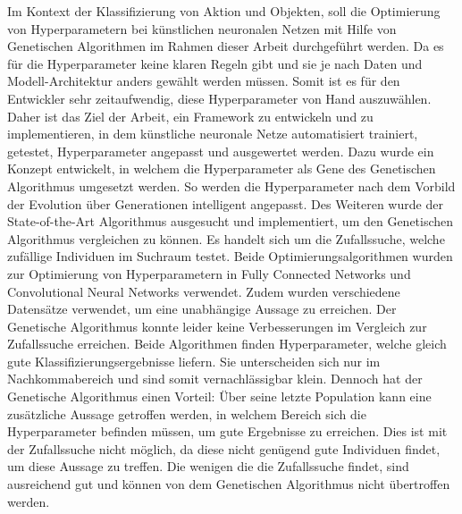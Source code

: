 \label{sec:Kurzfasssung}
Im Kontext der Klassifizierung von Aktion und Objekten, soll die Optimierung von Hyperparametern bei künstlichen neuronalen Netzen mit Hilfe von Genetischen Algorithmen im Rahmen dieser Arbeit durchgeführt werden. Da es für die Hyperparameter keine klaren Regeln gibt und sie je nach Daten und Modell-Architektur anders gewählt werden müssen. Somit ist es für den Entwickler sehr zeitaufwendig, diese Hyperparameter von Hand auszuwählen. Daher ist das Ziel der Arbeit, ein Framework zu entwickeln und zu implementieren, in dem künstliche neuronale Netze automatisiert trainiert, getestet, Hyperparameter angepasst und ausgewertet werden. Dazu wurde ein Konzept entwickelt, in welchem die Hyperparameter als Gene des Genetischen Algorithmus umgesetzt werden. So werden die Hyperparameter nach dem Vorbild der Evolution über Generationen intelligent angepasst. Des Weiteren wurde der State-of-the-Art Algorithmus ausgesucht und implementiert, um den Genetischen Algorithmus vergleichen zu können. Es handelt sich um die Zufallssuche, welche zufällige Individuen im Suchraum testet. Beide Optimierungsalgorithmen wurden zur Optimierung von Hyperparametern in Fully Connected Networks und Convolutional Neural Networks verwendet. Zudem wurden verschiedene Datensätze verwendet, um eine unabhängige Aussage zu erreichen. Der Genetische Algorithmus konnte leider keine Verbesserungen im Vergleich zur Zufallssuche erreichen. Beide Algorithmen finden Hyperparameter, welche gleich gute Klassifizierungsergebnisse liefern. Sie unterscheiden sich nur im Nachkommabereich und sind somit vernachlässigbar klein. Dennoch hat der Genetische Algorithmus einen Vorteil: Über seine letzte Population kann eine zusätzliche Aussage getroffen werden, in welchem Bereich sich die Hyperparameter befinden müssen, um gute Ergebnisse zu erreichen. Dies ist mit der Zufallssuche nicht möglich, da diese nicht genügend gute Individuen findet, um diese Aussage zu treffen. Die wenigen die die Zufallssuche findet, sind ausreichend gut und können von dem Genetischen Algorithmus nicht übertroffen werden.